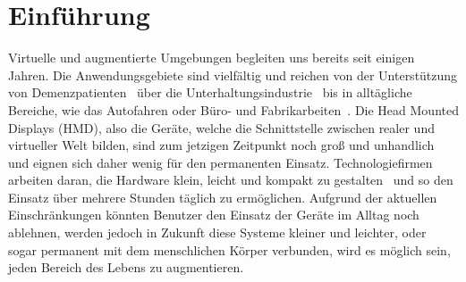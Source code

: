 \chapter{Einführung}

Virtuelle und augmentierte Umgebungen begleiten uns bereits seit einigen Jahren. Die Anwendungsgebiete sind vielfältig und reichen von der Unterstützung von Demenzpatienten~\cite{flynn2003developing, hayhurst2018augmented} über die Unterhaltungsindustrie~\cite{hughes2005mixed} bis in alltägliche Bereiche, wie das Autofahren oder Büro- und Fabrikarbeiten~\cite{medenica2011augmented, caudell1992augmented}. 
Die Head Mounted Displays (HMD), also die Geräte, welche die Schnittstelle zwischen realer und virtueller Welt bilden, sind zum jetzigen Zeitpunkt noch groß und unhandlich und eignen sich daher wenig für den permanenten Einsatz. Technologiefirmen arbeiten daran, die Hardware klein, leicht und kompakt zu gestalten~\cite{shibata2002head, sugihara2012head} und so den Einsatz über mehrere Stunden täglich zu ermöglichen.
Aufgrund der aktuellen Einschränkungen könnten Benutzer den Einsatz der Geräte im Alltag noch ablehnen, werden jedoch in Zukunft diese Systeme kleiner und leichter, oder sogar permanent mit dem menschlichen Körper verbunden, wird es möglich sein, jeden Bereich des Lebens zu augmentieren. 


